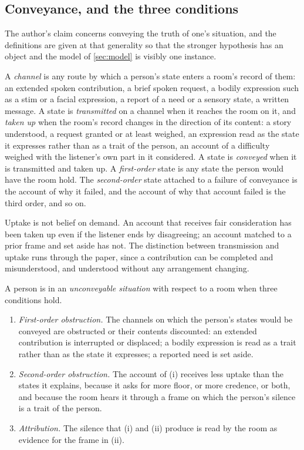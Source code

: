 \subsection{Conveyance, and the three conditions}

The author's claim concerns conveying the truth of one's situation, and the definitions are given at that generality so that the stronger hypothesis has an object and the model of \autoref{sec:model} is visibly one instance.

\begin{definition}\label{def:conveyance}
A \emph{channel} is any route by which a person's state enters a room's record of them: an extended spoken contribution, a brief spoken request, a bodily expression such as a stim or a facial expression, a report of a need or a sensory state, a written message. A state is \emph{transmitted} on a channel when it reaches the room on it, and \emph{taken up} when the room's record changes in the direction of its content: a story understood, a request granted or at least weighed, an expression read as the state it expresses rather than as a trait of the person, an account of a difficulty weighed with the listener's own part in it considered. A state is \emph{conveyed} when it is transmitted and taken up. A \emph{first-order} state is any state the person would have the room hold. The \emph{second-order} state attached to a failure of conveyance is the account of why it failed, and the account of why that account failed is the third order, and so on.
\end{definition}

Uptake is not belief on demand. An account that receives fair consideration has been taken up even if the listener ends by disagreeing; an account matched to a prior frame and set aside has not. The distinction between transmission and uptake runs through the paper, since a contribution can be completed and misunderstood, and understood without any arrangement changing.

\begin{definition}\label{def:situation}
A person is in an \emph{unconveyable situation} with respect to a room when three conditions hold.
\begin{enumerate}[label=(\roman*)]
\item \emph{First-order obstruction.} The channels on which the person's states would be conveyed are obstructed or their contents discounted: an extended contribution is interrupted or displaced; a bodily expression is read as a trait rather than as the state it expresses; a reported need is set aside.
\item \emph{Second-order obstruction.} The account of (i) receives less uptake than the states it explains, because it asks for more floor, or more credence, or both, and because the room hears it through a frame on which the person's silence is a trait of the person.
\item \emph{Attribution.} The silence that (i) and (ii) produce is read by the room as evidence for the frame in (ii).
\end{enumerate}
\end{definition}

